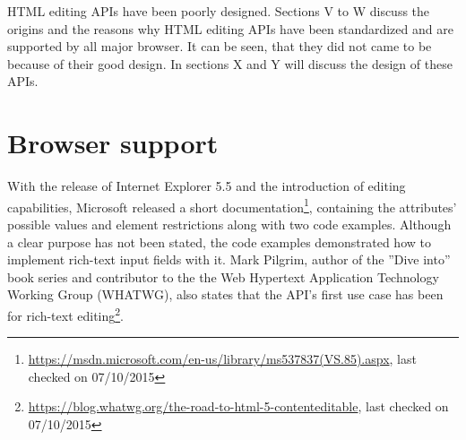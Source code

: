 HTML editing APIs have been poorly designed. Sections V to W discuss the origins and the reasons why HTML editing APIs have been standardized and are supported by all major browser. It can be seen, that they did not came to be because of their good design. In sections X and Y will discuss the design of these APIs.

\section{Browser support}

With the release of Internet Explorer 5.5 and the introduction of editing capabilities, Microsoft released a short documentation\footnote{\url{https://msdn.microsoft.com/en-us/library/ms537837(VS.85).aspx}, last checked on 07/10/2015}, containing the attributes' possible values and element restrictions along with two code examples. Although a clear purpose has not been stated, the code examples demonstrated how to implement rich-text input fields with it. Mark Pilgrim, author of the ''Dive into'' book series and contributor to the the Web Hypertext Application Technology Working Group (WHATWG), also states that the API's first use case has been for rich-text editing\footnote{\url{https://blog.whatwg.org/the-road-to-html-5-contenteditable}, last checked on 07/10/2015}. 




